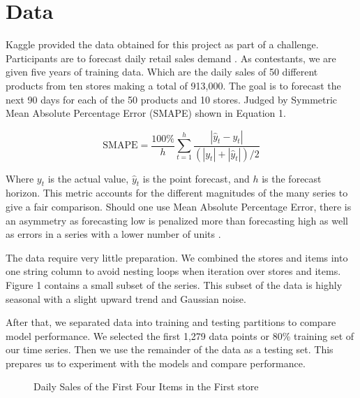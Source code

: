 \documentclass[16pt,twocolumn,letterpaper,titlepage]{article}
\begin{document}
\section{Data}

Kaggle provided the data obtained for this project as part of a challenge. Participants are to forecast daily retail sales demand \cite{kaggle}. As contestants, we are given five years of training data. Which are the daily sales of 50 different products from ten stores making a total of 913,000. The goal is to forecast the next 90 days for each of the 50 products and 10 stores. Judged by Symmetric Mean Absolute Percentage Error (SMAPE) shown in Equation 1.

\begin{equation}
\textrm{SMAPE}={\frac {100\%}{h}}\sum _{t=1}^{h}{\frac {\left|\hat{y}_t-y_t\right|}{(|y_t|+|\hat{y}_t|)/2}}
\end{equation}

Where $y_t$ is the actual value, $\hat{y}_t$ is the point forecast, and $h$ is the forecast horizon. This metric accounts for the different magnitudes of the many series to give a fair comparison. Should one use Mean Absolute Percentage Error, there is an asymmetry as forecasting low is penalized more than forecasting high as well as errors in a series with a lower number of units \cite{hyndman2006another}.

The data require very little preparation. We combined the stores and items into one string column to avoid nesting loops when iteration over stores and items. Figure 1 contains a small subset of the series. This subset of the data is highly seasonal with a slight upward trend and Gaussian noise.

After that, we separated data into training and testing partitions to compare model performance. We selected the first 1,279 data points or 80\% training set of our time series. Then we use the remainder of the data as a testing set. This prepares us to experiment with the models and compare performance. 


\begin{figure}[!htb]
	\caption{\label{fig:my-label} Daily Sales of the First Four Items in the First store}
\end{figure}
\end{document}
